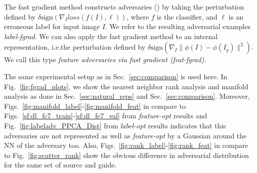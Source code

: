 \documentclass{article} %
\begin{document}
The fast gradient method constructs adversaries (\cite{GoodfellowEtalICLR2015})
by taking the perturbation defined by $\delta \text{sign}(\nabla_I loss(f(I),
\ell ))$, where $f$ is the classifier, and $\ell$ is an erroneous label for
input image $I$.  We refer to the resulting adversarial examples {\em
label-fgrad}. We can also apply the fast gradient method to an internal
representation, i.e.\taking the perturbation defined by $\delta
\text{sign}(\nabla_I \| \phi(I) - \phi(I_g) \|^2)$. We call this
type {\em feature adversaries via fast gradient (feat-fgrad)}.

The same experimental setup as in Sec.~\ref{sec:comparison} is used here.  In
Fig.~\ref{fig:fgrad_plots}, we show the nearest neighbor rank analysis and
manifold analysis as done in Sec.~\ref{sec:natural_reps} and
Sec.~\ref{sec:comparison}.  Moreover,
Figs.~\ref{fig:manifold_label}-\ref{fig:manifold_feat} in compare to
Figs.~\ref{sf:dl_fc7_train}-\ref{sf:dl_fc7_val} from {\em feature-opt} results
and Fig.~\ref{fig:labeladv_PPCA_Dist} from {\em label-opt} results indicates
that this adversaries are not represented as well as {\em feature-opt} by
a Gaussian around the NN of the adversary too. Also,
Figs.~\ref{fig:rank_label}-\ref{fig:rank_feat} in compare to
Fig.~\ref{fig:scatter_rank} show the obvious difference in adversarial
distribution for the same set of source and guide.
\end{document}
